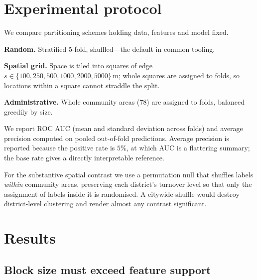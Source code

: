\documentclass[11pt]{article}
\begin{document}
\section{Experimental protocol}

We compare partitioning schemes holding data, features and model fixed.

\textbf{Random.} Stratified $5$-fold, shuffled---the default in common tooling.

\textbf{Spatial grid.} Space is tiled into squares of edge $s \in \{100, 250,
500, 1000, 2000, 5000\}$\,m; whole squares are assigned to folds, so locations
within a square cannot straddle the split.

\textbf{Administrative.} Whole community areas ($78$) are assigned to folds,
balanced greedily by size.

We report ROC AUC (mean and standard deviation across folds) and average
precision computed on pooled out-of-fold predictions. Average precision is
reported because the positive rate is $5\%$, at which AUC is a flattering
summary; the base rate gives a directly interpretable reference.

For the substantive spatial contrast we use a permutation null that shuffles
labels \emph{within} community areas, preserving each district's turnover level
so that only the assignment of labels inside it is randomised. A citywide shuffle
would destroy district-level clustering and render almost any contrast
significant.

\section{Results}

\subsection{Block size must exceed feature support}
\end{document}
